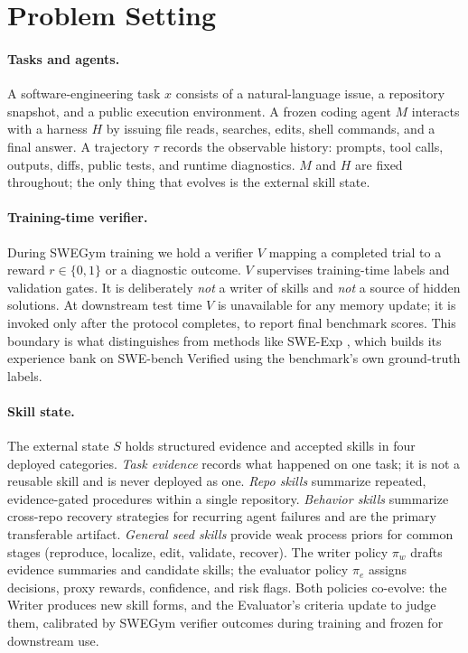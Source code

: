 \section{Problem Setting}

\paragraph{Tasks and agents.}
A software-engineering task $x$ consists of a natural-language issue, a
repository snapshot, and a public execution environment. A frozen coding agent
$M$ interacts with a harness $H$ by issuing file reads, searches, edits, shell
commands, and a final answer. A trajectory $\tau$ records the observable history:
prompts, tool calls, outputs, diffs, public tests, and runtime diagnostics. $M$
and $H$ are fixed throughout; the only thing that evolves is the external skill
state.

\paragraph{Training-time verifier.}
During SWEGym training we hold a verifier $V$ mapping a completed trial to a
reward $r \in \{0,1\}$ or a diagnostic outcome. $V$ supervises training-time
labels and validation gates. It is deliberately \emph{not} a writer of skills
and \emph{not} a source of hidden solutions. At downstream test time $V$ is
unavailable for any memory update; it is invoked only after the protocol
completes, to report final benchmark scores. This boundary is what
distinguishes \method{} from methods like SWE-Exp \citep{sweexp2025}, which
builds its experience bank on SWE-bench Verified using the benchmark's own
ground-truth labels.

\paragraph{Skill state.}
The external state $S$ holds structured evidence and accepted skills in four
deployed categories. \emph{Task evidence} records what happened on one task;
it is not a reusable skill and is never deployed as one. \emph{Repo skills}
summarize repeated, evidence-gated procedures within a single repository.
\emph{Behavior skills} summarize cross-repo recovery strategies for recurring
agent failures and are the primary transferable artifact. \emph{General seed
skills} provide weak process priors for common stages (reproduce, localize,
edit, validate, recover). The writer policy $\pi_w$ drafts evidence summaries
and candidate skills; the evaluator policy $\pi_e$ assigns decisions, proxy
rewards, confidence, and risk flags. Both policies co-evolve: the Writer
produces new skill forms, and the Evaluator's criteria update to judge them,
calibrated by SWEGym verifier outcomes during training and frozen for
downstream use.
